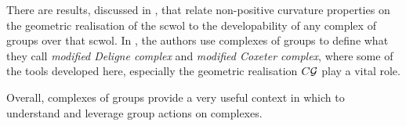 There are results, discussed in \cite[Section 6]{haefliger_complexes_1991}, that relate non-positive curvature properties on the geometric realisation of the scwol to the developability of any complex of groups over that scwol.
In \cite{charney_davis_kpi_1995}, the authors use complexes of groups to define what they call \emph{modified Deligne complex} and \emph{modified Coxeter complex}, where some of the tools developed here, especially the geometric realisation $C\mathcal{G}$ play a vital role.

Overall, complexes of groups provide a very useful context in which to understand and leverage group actions on complexes.
